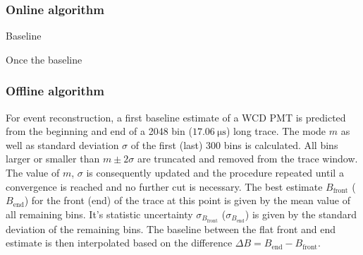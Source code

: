 \subsubsection{Online algorithm}
\label{sssec:online-calibration}

\TODO Baseline

Once the baseline 


\subsubsection{Offline algorithm}
\label{sssec:offline-calibration}

For event reconstruction, a first baseline estimate of a WCD PMT is predicted from the beginning and end of a 2048 bin ($\SI{17.06}{\micro\second}$) long trace. The 
mode $m$ as well as standard deviation $\sigma$ of the first (last) 300 bins is calculated. All bins larger or smaller than $m\pm2\sigma$ are truncated and removed 
from the trace window. The value of $m$, $\sigma$ is consequently updated and the procedure repeated until a convergence is reached and no further cut is necessary. 
The best estimate $B_\text{front}$ ($B_\text{end}$) for the front (end) of the trace at this point is given by the mean value of all remaining bins. It's statistic 
uncertainty $\sigma_{B_\text{front}}$ ($\sigma_{B_\text{end}}$) is given by the standard deviation of the remaining bins. The baseline between the flat front and end 
estimate is then interpolated based on the difference $\Delta B = B_\text{end} - B_\text{front}$.

